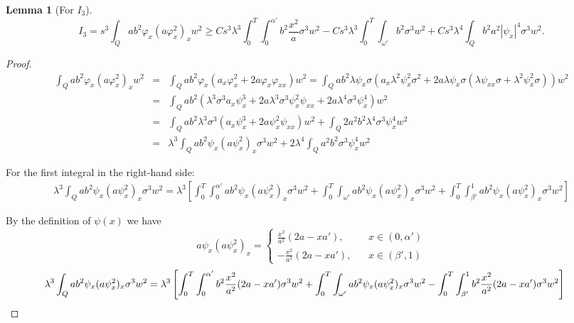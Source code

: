 \documentclass[11pt,oneside,a4papper]{osajnl}
\newtheorem{lema}{Lemma}
\begin{document}
\begin{lema}[For $I_3$]\label{lemaA4}
	$$I_3=s^3\int_{Q} ab^2\varphi_x (a\varphi_x^2)_x  w^2\geq
	C s^3 \lambda^3 \int_0^T \int_0^{\alpha'} b^2 \frac{x^2}{a} \sigma^3 w^2 - Cs^3\lambda^3 \int_0^T\int_{\omega'} b^2 \sigma^3 w^2 + C s^3 \lambda^4 \int_Q b^2 a^2 |\psi_x|^4 \sigma^3 w^2.$$
\end{lema}
\begin{proof}
	\begin{eqnarray*}
		\int_{Q} ab^2\varphi_x (a\varphi_x^2)_x  w^2&=&\int_{Q} ab^2 \varphi_x (a_x \varphi_x^2+2a\varphi_x\varphi_{xx})  w^2=\int_{Q} ab^2 \lambda\psi_x\sigma (a_x \lambda^2\psi_x^2\sigma^2+2a\lambda\psi_x\sigma(\lambda \psi_{xx}\sigma+\lambda^2\psi_x^2\sigma))  w^2\\
		&=&\int_{Q} ab^2  (\lambda^3\sigma^3a_x \psi_x^3+2a\lambda^3\sigma^3\psi_x^2\psi_{xx}+2a\lambda^4\sigma^3\psi_x^4)  w^2\\
		&=&\int_{Q} ab^2  \lambda^3\sigma^3(a_x \psi_x^3+2a\psi_x^2\psi_{xx})w^2+\int_{Q} 2a^2b^2\lambda^4\sigma^3\psi_x^4  w^2\\
		&=&\lambda^3\int_{Q} ab^2 \psi_x (a\psi_x^2)_x\sigma^3w^2+2\lambda^4\int_{Q} a^2b^2\sigma^3\psi_x^4  w^2
	\end{eqnarray*}

    For the first integral in the right-hand side: 
	\begin{eqnarray*}
		\lambda^3\int_{Q} ab^2 \psi_x (a\psi_x^2)_x\sigma^3w^2 = \lambda^3 \left[ \int_0^T \int_0^{\alpha'} ab^2 \psi_x (a\psi_x^2)_x\sigma^3w^2 +  \int_0^T\int_{\omega'} ab^2 \psi_x (a\psi_x^2)_x\sigma^3w^2 +  \int_0^T \int_{\beta'}^1 ab^2 \psi_x (a\psi_x^2)_x\sigma^3w^2  \right]
	\end{eqnarray*}
	
	By the definition of $\psi(x)$ we have
	$$a\psi_x (a\psi_x^2)_x=\begin{cases}
		\frac{x^2}{a^2}(2a-xa'), \ \ & \ \ x\in(0,\alpha')\\
		-\frac{x^2}{a^2}(2a-xa'), \ \ & \ \ x\in(\beta',1)
	\end{cases}$$
	\begin{eqnarray*}
		\hspace*{-0.5cm}\lambda^3\int_{Q} ab^2 \psi_x (a\psi_x^2)_x\sigma^3w^2=\lambda^3 \left[\int_0^T \int_0^{\alpha'} b^2 \frac{x^2}{a^2}(2a-xa')\sigma^3w^2 +  \int_0^T\int_{\omega'} ab^2 \psi_x (a\psi_x^2)_x\sigma^3w^2 - \int_0^T \int_{\beta'}^1 b^2 \frac{x^2}{a^2}(2a-xa')\sigma^3w^2 \right]
	\end{eqnarray*}
	

\end{proof}
\end{document}
